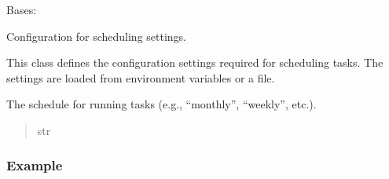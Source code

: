 \documentclass[letterpaper,10pt,english]{sphinxmanual}
\begin{document}
\begin{fulllineitems}
\pysigstopsignatures
\sphinxAtStartPar
Bases: 

\sphinxAtStartPar
Configuration for scheduling settings.

\sphinxAtStartPar
This class defines the configuration settings required for scheduling tasks.
The settings are loaded from environment variables or a  file.

\begin{fulllineitems}
\label{\detokenize{config:config.schedule.ScheduleSettings.SCHEDULE}}
\pysigstartsignatures
{}
\pysigstopsignatures
\sphinxAtStartPar
The schedule for running tasks (e.g., “monthly”, “weekly”, etc.).
\begin{quote}\begin{description}
\sphinxAtStartPar
str

\end{description}\end{quote}

\end{fulllineitems}

\subsubsection*{Example}

\begin{sphinxVerbatim}[commandchars=\\\{\}]
  
\end{sphinxVerbatim}

\begin{fulllineitems}
\label{\detokenize{config:config.schedule.ScheduleSettings.FREQUENCY}}
\pysigstartsignatures
{}
\pysigstopsignatures
\end{fulllineitems}


\end{fulllineitems}
\end{document}
